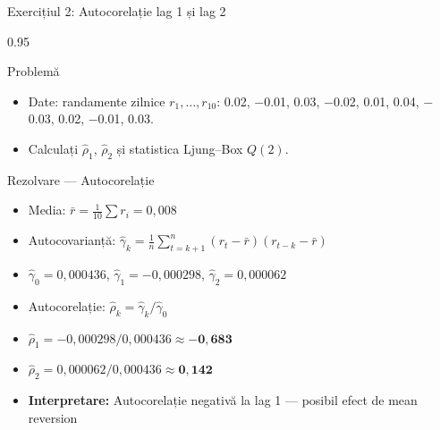 \documentclass[9pt, aspectratio=169, t]{beamer}
\begin{document}
\begin{frame}[shrink=15]{Exercițiul 2: Autocorelație lag 1 și lag 2}
\begin{cminipage}{0.95\textwidth}
\begin{block}{Problemă}
\begin{itemize}\setlength{\itemsep}{0pt}
    \item Date: randamente zilnice $r_1, \ldots, r_{10}$: 0.02, $-$0.01, 0.03, $-$0.02, 0.01, 0.04, $-$0.03, 0.02, $-$0.01, 0.03.
    \item Calculați $\hat\rho_1$, $\hat\rho_2$ și statistica Ljung--Box $Q(2)$.
\end{itemize}
\end{block}

\begin{exampleblock}{Rezolvare --- Autocorelație}
\small
\begin{itemize}\setlength{\itemsep}{0pt}
    \item Media: $\bar{r} = \frac{1}{10}\sum r_i = 0{,}008$
    \item Autocovarianță: $\hat\gamma_k = \frac{1}{n}\sum_{t=k+1}^{n}(r_t - \bar{r})(r_{t-k} - \bar{r})$
    \item $\hat\gamma_0 = 0{,}000436$, \; $\hat\gamma_1 = -0{,}000298$, \; $\hat\gamma_2 = 0{,}000062$
    \item Autocorelație: $\hat\rho_k = \hat\gamma_k / \hat\gamma_0$
    \item $\hat\rho_1 = -0{,}000298 / 0{,}000436 \approx \mathbf{-0{,}683}$
    \item $\hat\rho_2 = 0{,}000062 / 0{,}000436 \approx \mathbf{0{,}142}$
    \item \textbf{Interpretare:} Autocorelație negativă la lag 1 --- posibil efect de mean reversion
\end{itemize}
\end{exampleblock}
\end{cminipage}
\end{frame}
\end{document}
